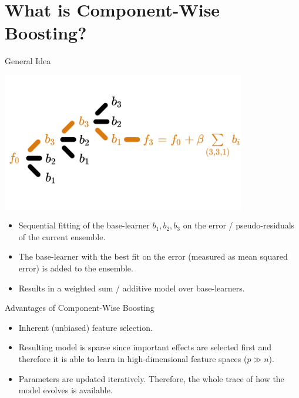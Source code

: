 \documentclass[10pt]{beamer}\usepackage[]{graphicx}\usepackage[]{color}
\begin{document}
\section{What is Component-Wise Boosting?}

\begin{frame}{General Idea}

\begin{center}
\includegraphics[width=0.8\textwidth]{./images/cboost_gif_norisk.png}
\end{center}

\vspace{-1cm}

\begin{itemize}

  \item
    Sequential fitting of the base-learner $b_1, b_2, b_3$ on the error / pseudo-residuals of the current ensemble.

  \item
    The base-learner with the best fit on the error (measured as mean squared error) is added to the ensemble.

  \item
    Results in a weighted sum / additive model over base-learners.

\end{itemize}

\end{frame}

\begin{frame}{Advantages of Component-Wise Boosting}

  \begin{itemize}

    \item
      Inherent (unbiased) feature selection.

    \item
      Resulting model is sparse since important effects are selected first and therefore it is able to learn in high-dimensional feature spaces ($p \gg n$).

    \item
      Parameters are updated iteratively. Therefore, the whole trace of how the model evolves is available. \vspace{0.3cm}

  \end{itemize}

\end{frame}
\end{document}
